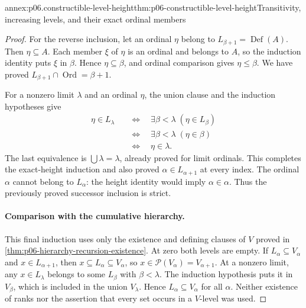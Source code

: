 \begin{annexitem}{annex:p06.constructible-level-height}{thm:p06-constructible-level-height}{Transitivity, increasing levels, and their exact ordinal members}
\begin{proof}
For the reverse inclusion, let an ordinal \(\eta\) belong to
\(L_{\beta+1}=\operatorname{Def}(A)\).
Then \(\eta\subseteq A\).  Each member \(\xi\) of \(\eta\)
is an ordinal and belongs to \(A\), so the induction identity
puts \(\xi\) in \(\beta\).  Hence \(\eta\subseteq\beta\),
and ordinal comparison gives \(\eta\leq\beta\).
We have proved
\(L_{\beta+1}\cap\operatorname{Ord}=\beta+1\).

For a nonzero limit \(\lambda\) and an ordinal \(\eta\),
the union clause and the induction hypotheses give
\[
\begin{aligned}
 \eta\in L_\lambda
 &\quad\Longleftrightarrow\quad
       \exists\beta<\lambda\;(\eta\in L_\beta)\\
 &\quad\Longleftrightarrow\quad
       \exists\beta<\lambda\;(\eta\in\beta)\\
 &\quad\Longleftrightarrow\quad \eta\in\lambda.
\end{aligned}
\]
The last equivalence is \(\bigcup\lambda=\lambda\), already
proved for limit ordinals.  This completes the exact-height
induction and also proved \(\alpha\in L_{\alpha+1}\) at every
index.  The ordinal \(\alpha\) cannot belong to \(L_\alpha\):
the height identity would imply \(\alpha\in\alpha\).
Thus the previously proved successor inclusion is strict.

\paragraph{Comparison with the cumulative hierarchy.}
This final induction uses only the existence and defining clauses
of \(V\) proved in \cref{thm:p06-hierarchy-recursion-existence}.
At zero both levels are empty.  If \(L_\alpha\subseteq V_\alpha\)
and \(x\in L_{\alpha+1}\), then
\(x\subseteq L_\alpha\subseteq V_\alpha\), so
\(x\in\mathcal{P}(V_\alpha)=V_{\alpha+1}\).
At a nonzero limit, any \(x\in L_\lambda\) belongs to some
\(L_\beta\) with \(\beta<\lambda\).  The induction hypothesis
puts it in \(V_\beta\), which is included in the union
\(V_\lambda\).  Hence \(L_\alpha\subseteq V_\alpha\) for all
\(\alpha\).  Neither existence of ranks nor the assertion that
every set occurs in a \(V\)-level was used.
\end{proof}
\end{annexitem}

